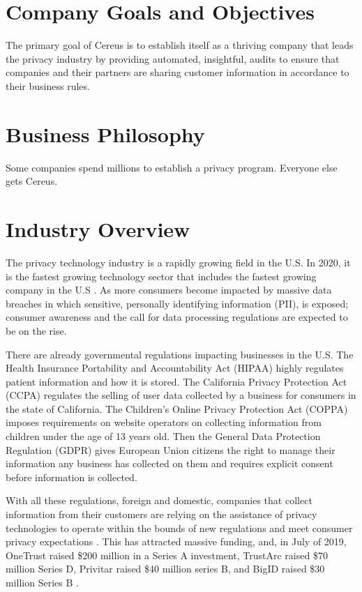 \section{Company Goals and Objectives}

The primary goal of Cereus is to establish itself as a thriving company that leads the privacy industry by providing automated, insightful, audits to ensure that companies and their partners are sharing customer information in accordance to their business rules.

\section{Business Philosophy}

Some companies spend millions to establish a privacy program. Everyone else gets Cereus.

\section{Industry Overview}

The privacy technology industry is a rapidly growing field in the U.S. In 2020, it is the fastest growing technology sector that includes the fastest growing company in the U.S \cite{hughes.iapp.2020}. As more consumers become impacted by massive data breaches in which sensitive, personally identifying information (PII), is exposed; consumer awareness and the call for data processing regulations are expected to be on the rise.

There are already governmental regulations impacting businesses in the U.S. The Health Insurance Portability and Accountability Act (HIPAA) highly regulates patient information and how it is stored. The California Privacy Protection Act (CCPA) regulates the selling of user data collected by a business for consumers in the state of California. The Children's Online Privacy Protection Act (COPPA) imposes requirements on website operators on collecting information from children under the age of 13 years old. Then the General Data Protection Regulation (GDPR) gives European Union citizens the right to manage their information any business has collected on them and requires explicit consent before information is collected.

With all these regulations, foreign and domestic, companies that collect information from their customers are relying on the assistance of privacy technologies to operate within the bounds of new regulations and meet consumer privacy expectations \cite{meehan.forbes.2019}. This has attracted massive funding, and, in July of 2019, OneTrust raised \$200 million in a Series A investment, TrustArc raised \$70 million Series D, Privitar raised \$40 million series B, and BigID raised \$30 million Series B \cite{wood.fpf.2019}.

